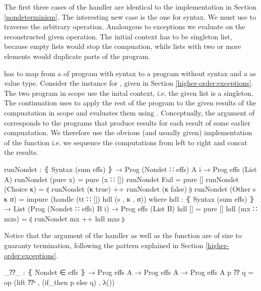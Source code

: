 The first three cases of the handler are identical to the implementation in
Section \ref{nondeterminism}.
The interesting new case is the one for  syntax.
We must use  to traverse the arbitrary operation.
Analougous to exceptions we evaluate  on the reconstructed
given operation.
The initial context has to be singleton list, because empty lists would
stop the compuation, while lists with two or more elements would duplicate
parts of the program.

 has to map from a  of program with
 syntax to a program without 
syntax and a  as value type.
Consider the  instance for , given in
Section \ref{higher-order:exceptions}.
The two program in scope use the inital context, i.e. the given list is a
singleton.
The continuation uses \AgdaFunction{<\$>} to apply the rest of the program to
the given results of the compuatation in scope and evaluates them using
.
Conceptually, the argument of  corresponds to the
programs that produce results for each result of some earlier compuatation.
We therefore use the obvious (and usually given) implementation of the
 function i.e. we sequence the computations from left to right
and concat the results.

\begin{code}
runNondet : ⦃ Syntax (sum effs) ⦄ → Prog (Nondet ∷ effs) A {i} → Prog effs (List A)
runNondet (pure x)       = pure (x ∷ [])
runNondet Fail           = pure []
runNondet (Choice κ)     = ⦇ runNondet (κ true) ++ runNondet (κ false) ⦈
runNondet (Other s κ σ)  = impure (handle (tt ∷ []) hdl (s , κ , σ))
  where  hdl : ⦃ Syntax (sum effs) ⦄ →
           List (Prog (Nondet ∷ effs) B {i}) → Prog effs (List B)
         hdl []          = pure []
         hdl (mx ∷ mxs)  = ⦇ runNondet mx ++ hdl mxs ⦈
\end{code}
Notice that the argument of the handler as well as the 
function are of size  to guaranty termination, following the
pattern explained in Section \ref{higher-order:exceptions}.

\begin{code}
_⁇_ : ⦃ Nondet ∈ effs ⦄ → Prog effs A → Prog effs A → Prog effs A
p ⁇ q = op (lift ⁇ˢ , (if_then p else q) , λ())
\end{code}

